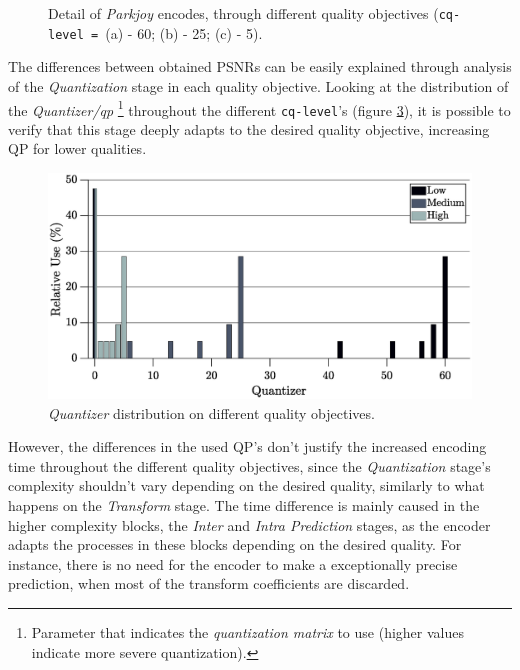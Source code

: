 \begin{figure}[!htpb]
\begin{subfigure}[c]{\textwidth}
            \caption{}
            \label{subfig:highq}
        \end{subfigure}
        \caption{Detail of \emph{Parkjoy} encodes, through different quality objectives (\texttt{cq-level = }(a) - 60; (b) - 25; (c) - 5).}
    \label{fig:qdiffs}
\end{figure}

The differences between obtained PSNRs can be easily explained through analysis of the \emph{Quantization} stage in each quality objective. Looking at the distribution of the \emph{Quantizer/\Gls{qp}} 
\footnote{Parameter that indicates the \emph{quantization matrix} to use (higher values indicate more severe quantization).}
throughout the different \texttt{cq-level}'s (figure \ref{fig:quantavg}), it is possible to verify that this stage deeply adapts to the desired quality objective, increasing QP for lower qualities. 

\begin{figure}[!htpb]
    \centering
    \includegraphics[width=\textwidth]{Sections/3Transforms/Images/quantizerAvg.eps}
    \caption{\emph{Quantizer} distribution on different quality objectives.}
    \label{fig:quantavg}
\end{figure}

However, the differences in the used QP's don't justify the increased encoding time throughout the different quality objectives, since the \emph{Quantization} stage's complexity shouldn't vary depending on the desired quality, similarly to what happens on the \emph{Transform} stage. The time difference is mainly caused in the higher complexity blocks, the \emph{Inter} and \emph{Intra Prediction} stages, as the encoder adapts the processes in these blocks depending on the desired quality. For instance, there is no need for the encoder to make a exceptionally precise prediction, when most of the transform coefficients are discarded.

